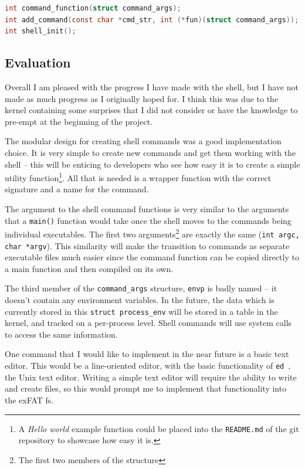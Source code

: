 \documentclass{article}
\begin{document}
\begin{lstlisting}[language=C, caption={The signatures of some important
                   functions for the shell}, float,
                   label={lst:shell-func-signatures}]
int command_function(struct command_args);
int add_command(const char *cmd_str, int (*fun)(struct command_args));
int shell_init();
\end{lstlisting}

\subsection{Evaluation}
Overall I am pleased with the progress I have made with the shell, but I have
not made as much progress as I originally hoped for. I think this was due to
the kernel containing some surprises that I did not consider or have the
knowledge to pre-empt at the beginning of the project.

The modular design for creating shell commands was a good implementation
choice. It is very simple to create new commands and get them working with the
shell -- this will be enticing to developers who see how easy it is to create a
simple utility function\footnote{A \emph{Hello world} example function could be
placed into the \texttt{README.md} of the git repository to showcase how easy
it is.}. All that is needed is a wrapper function with the correct signature
and a name for the command.

The argument to the shell command functions is very similar to the arguments
that a \texttt{main()} function would take once the shell moves to the commands
being individual executables. The first two arguments\footnote{The first two
members of the structure} are exactly the same (\verb!int argc, char *argv!).
This similarity will make the transition to commands as separate executable
files much easier since the command function can be copied directly to a main
function and then compiled on its own.

The third member of the \verb!command_args! structure, \verb!envp! is badly
named -- it doesn't contain any environment variables. In the future, the data
which is currently stored in this \verb!struct process_env! will be stored in a
table in the kernel, and tracked on a per-process level. Shell commands will
use system calls to access the same information.

One command that I would like to implement in the near future is a basic text
editor. This would be a line-oriented editor, with the basic functionality of
\texttt{ed}~\cite{ed}, the Unix text editor. Writing a simple text editor will
require the ability to write and create files, so this would prompt me to
implement that functionality into the exFAT \gls{fs}.
\end{document}
